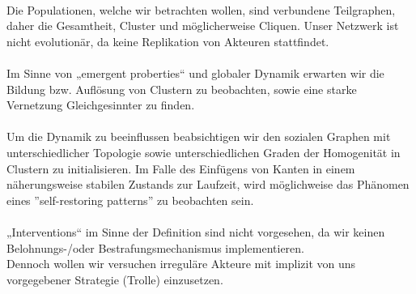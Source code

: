 \documentclass[11pt, a4paper]{scrartcl}
\begin{document}
\\
Die Populationen, welche wir betrachten wollen, sind verbundene Teilgraphen, daher die Gesamtheit, Cluster und möglicherweise Cliquen.
Unser Netzwerk ist nicht evolutionär, da keine Replikation von Akteuren stattfindet.\\
\\
Im Sinne von „emergent proberties“ und globaler Dynamik erwarten wir die Bildung bzw. Auflösung von Clustern zu beobachten, sowie eine starke Vernetzung Gleichgesinnter zu finden.\\
\\
Um die Dynamik zu beeinflussen beabsichtigen wir den sozialen Graphen mit unterschiedlicher Topologie sowie unterschiedlichen Graden der Homogenität in Clustern zu initialisieren.
Im Falle des Einfügens von Kanten in einem näherungsweise stabilen Zustands zur Laufzeit, wird möglichweise das Phänomen eines ''self-restoring patterns'' zu beobachten sein.\\
 \\
„Interventions“ im Sinne der Definition sind nicht vorgesehen, da wir keinen Belohnungs-/oder Bestrafungsmechanismus implementieren.\\
Dennoch wollen wir versuchen irreguläre Akteure mit implizit von uns vorgegebener Strategie (Trolle) einzusetzen.
\end{document}
